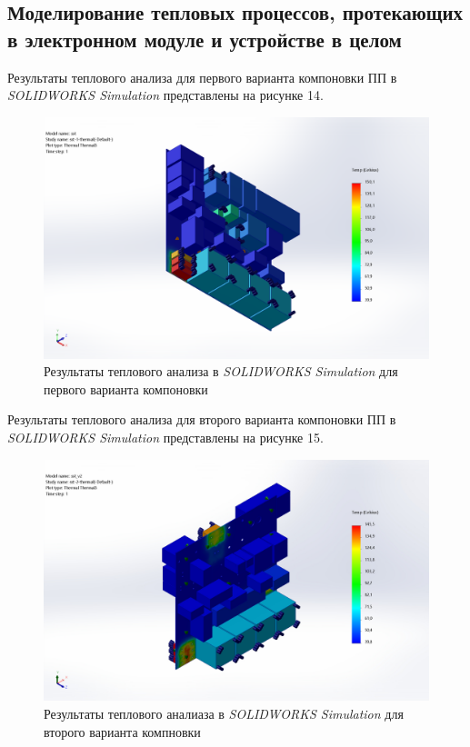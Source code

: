 \subsection{Моделирование тепловых процессов, протекающих в электронном модуле и устройстве в целом}

Результаты теплового анализа для первого варианта компоновки ПП
в \textit{SOLIDWORKS Simulation} представлены на рисунке 14.

\begin{figure}[h]
  \centering
  \includegraphics[scale=0.3]{../img/sst-1/thermal/top_view.png}
  \caption{Результаты теплового анализа в \textit{SOLIDWORKS Simulation}
    для первого варианта компоновки}
\end{figure}

Результаты теплового анализа для второго варианта компоновки ПП в
\textit{SOLIDWORKS Simulation} представлены на рисунке 15.

\begin{figure}[h]
  \centering
  \includegraphics[scale=0.3]{../img/sst-2/thermal/sst_v2-sst-2-thermal-Thermal-Thermal3.jpg}
  \caption{Результаты теплового аналиаза в \textit{SOLIDWORKS Simulation}
    для второго варианта компновки}
\end{figure}

